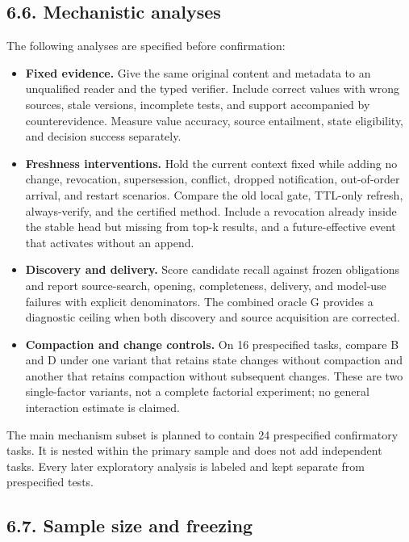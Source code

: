 \documentclass[
  11pt,
  a4paper,
]{article}
\providecommand{\tightlist}{%
  \setlength{\itemsep}{0pt}\setlength{\parskip}{0pt}}
\begin{document}
\subsection{6.6. Mechanistic analyses}\label{mechanistic-analyses}

The following analyses are specified before confirmation:

\begin{itemize}
\tightlist
\item
  \textbf{Fixed evidence.} Give the same original content and metadata
  to an unqualified reader and the typed verifier. Include correct
  values with wrong sources, stale versions, incomplete tests, and
  support accompanied by counterevidence. Measure value accuracy, source
  entailment, state eligibility, and decision success separately.
\item
  \textbf{Freshness interventions.} Hold the current context fixed while
  adding no change, revocation, supersession, conflict, dropped
  notification, out-of-order arrival, and restart scenarios. Compare the
  old local gate, TTL-only refresh, always-verify, and the certified
  method. Include a revocation already inside the stable head but
  missing from top-k results, and a future-effective event that
  activates without an append.
\item
  \textbf{Discovery and delivery.} Score candidate recall against frozen
  obligations and report source-search, opening, completeness, delivery,
  and model-use failures with explicit denominators. The combined oracle
  G provides a diagnostic ceiling when both discovery and source
  acquisition are corrected.
\item
  \textbf{Compaction and change controls.} On 16 prespecified tasks,
  compare B and D under one variant that retains state changes without
  compaction and another that retains compaction without subsequent
  changes. These are two single-factor variants, not a complete
  factorial experiment; no general interaction estimate is claimed.
\end{itemize}

The main mechanism subset is planned to contain 24 prespecified
confirmatory tasks. It is nested within the primary sample and does not
add independent tasks. Every later exploratory analysis is labeled and
kept separate from prespecified tests.

\subsection{6.7. Sample size and
freezing}\label{sample-size-and-freezing}
\end{document}

